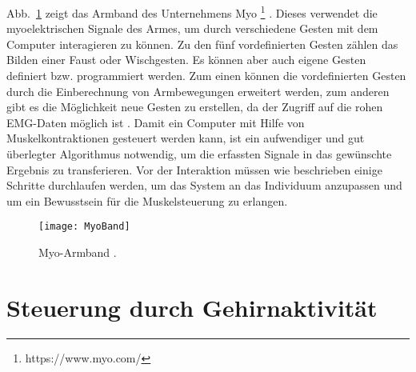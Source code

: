 \newline \newline
Abb.~\ref{fig:MyoBand} zeigt das Armband des Unternehmens Myo%
\footnote{https://www.myo.com/}
%
. Dieses verwendet die myoelektrischen Signale des Armes, um durch verschiedene Gesten mit dem Computer interagieren zu können. Zu den fünf vordefinierten Gesten zählen \zB das Bilden einer Faust oder Wischgesten. Es können aber auch eigene Gesten definiert bzw. programmiert werden. Zum einen können die vordefinierten Gesten durch die Einberechnung von Armbewegungen erweitert werden, zum anderen gibt es die Möglichkeit neue Gesten zu erstellen, da der Zugriff auf die rohen EMG-Daten möglich ist \cite{myoBand2}.%
\newline \newline
Damit ein Computer mit Hilfe von Muskelkontraktionen gesteuert werden kann, ist ein aufwendiger und gut überlegter Algorithmus notwendig, um die erfassten Signale in das gewünschte Ergebnis zu transferieren. Vor der Interaktion müssen wie beschrieben einige Schritte durchlaufen werden, um das System an das Individuum anzupassen und um ein Bewusstsein für die Muskelsteuerung zu erlangen.
%
%
\begin{figure}
\centering
\texttt{[image: MyoBand]}
\caption{Myo-Armband \cite{myoBand}.}
\label{fig:MyoBand}
\end{figure}
%
%

\section{Steuerung durch Gehirnaktivität}

